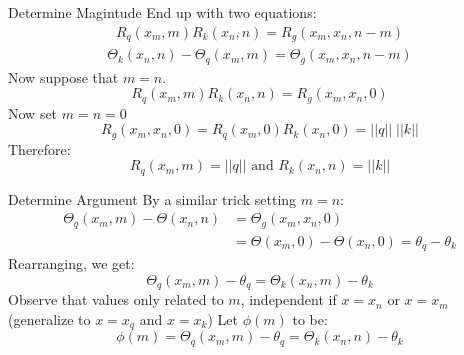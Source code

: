 \documentclass{beamer}
\begin{document}
\begin{frame}[t]{Determine Magintude}
    End up with two equations:
    \begin{gather}\label{eq:mag}
        R_q(x_m, m) R_k(x_n, n) = R_g(x_m, x_n, n - m)
    \end{gather}
    \vspace{-3em}
    \begin{gather}\label{eq:arg}
        \Theta_k(x_n, n) - \Theta_q(x_m, m) = \Theta_g(x_m, x_n, n - m)
    \end{gather}
    Now suppose that $m = n$. %
    \[R_q(x_m, m) R_k(x_n, n) = R_g(x_m, x_n, 0)\]
    Now set $m = n = 0$
    \[R_g(x_m, x_n, 0) = R_q(x_m, 0) R_k(x_n, 0) = ||q|| \; ||k ||\]
    Therefore:
    \[R_q(x_m, m) = ||q|| \text{ and } R_k(x_n, n) = || k ||\]
\end{frame}

\begin{frame}[t]{Determine Argument}
    By a similar trick setting $m=n$:
    \begin{align}
        \Theta_q(x_m, m) - \Theta(x_n, n) &= \Theta_g(x_m, x_n, 0)\\
        &= \Theta(x_m, 0) - \Theta(x_n, 0) = \theta_q - \theta_k
    \end{align}
    Rearranging, we get:
    \[\Theta_q(x_m, m) - \theta_q = \Theta_k(x_n, m) - \theta_k\]
    Observe that values only related to $m$, independent if $x = x_n$ or $x = x_m$ (generalize to $x = x_q$ and $x = x_k$)\newline
    Let $\phi(m)$ to be:
    \[\phi(m) = \Theta_q(x_m, m) - \theta_q = \Theta_k(x_n, n) - \theta_k\]
\end{frame}
\end{document}
